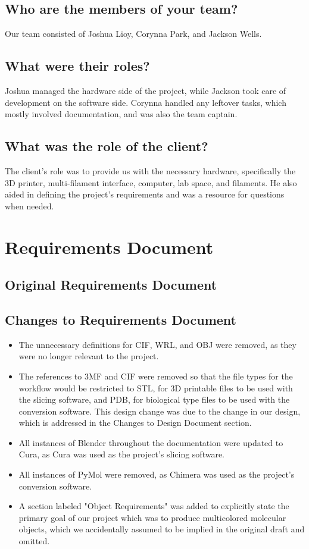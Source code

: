 \documentclass[letterpaper, onecolumn, draftclsnofoot, 10pt, compsoc]{IEEEtran}
\begin{document}
\begin{singlespace}
	\subsection{Who are the members of your team?}
	Our team consisted of Joshua Lioy, Corynna Park, and Jackson Wells.
	\subsection{What were their roles?}
	Joshua managed the hardware side of the project, while Jackson took care of development on the software side. Corynna handled any leftover tasks, which mostly involved documentation, and was also the team captain. 
	\subsection{What was the role of the client?}
	The client's role was to provide us with the necessary hardware, specifically the 3D printer, multi-filament interface, computer, lab space, and filaments. 
	He also aided in defining the project's requirements and was a resource for questions when needed.
	
	\section{Requirements Document}
	\subsection{Original Requirements Document}
	
	\subsection{Changes to Requirements Document} %
	\begin{itemize}
	\item The unnecessary definitions for CIF, WRL, and OBJ were removed, as they were no longer relevant to the project.
	\item The references to 3MF and CIF were removed so that the file types for the workflow would be restricted to STL, for 3D printable files to be used with the slicing software, and PDB, for biological type files to be used with the conversion software.
	This design change was due to the change in our design, which is addressed in the Changes to Design Document section.
	\item All instances of Blender throughout the documentation were updated to Cura, as Cura was used as the project's slicing software.
	\item All instances of PyMol were removed, as Chimera was used as the project's conversion software.
	\item A section labeled "Object Requirements" was added to explicitly state the primary goal of our project which was to produce multicolored molecular objects, which we accidentally assumed to be implied in the original draft and omitted.
	\end{itemize}

\end{singlespace}
\end{document}
